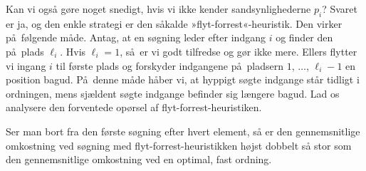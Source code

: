 
Kan vi også gøre noget snedigt, hvis vi ikke kender sandsynlighederne $p_i$? 
Svaret er ja, og den enkle strategi er den såkalde »flyt-forrest«-heuristik.
Den virker på følgende måde.
Antag, at en søgning leder efter indgang $i$ og finder den på plads $\ell_i$.
Hvis $\ell_i = 1$, så er vi godt tilfredse og gør ikke mere.
Ellers flytter vi ingang $i$ til første plads og forskyder indgangene på pladsern $1$, $\ldots$,  $\ell_i-1$ en position bagud.
På denne måde håber vi, at hyppigt søgte indgange står tidligt i ordningen, mens sjældent søgte indgange befinder sig længere bagud.
Lad os analysere den forventede opørsel af flyt-forrest-heuristiken.

\begin{thm} 
  Ser man bort fra den første søgning efter hvert element, så er den gennemsnitlige omkostning ved søgning med flyt-forrest-heuristikken højst dobbelt så stor som den gennemsnitlige omkostning ved en optimal, fast ordning.
\end{thm}


